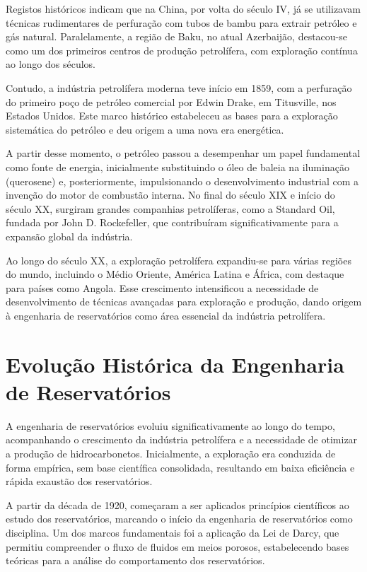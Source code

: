 \documentclass[12pt,a4paper]{report}
\begin{document}
Registos históricos indicam que na China, por volta do século IV, já se utilizavam técnicas rudimentares de perfuração com tubos de bambu para extrair petróleo e gás natural. Paralelamente, a região de Baku, no atual Azerbaijão, destacou-se como um dos primeiros centros de produção petrolífera, com exploração contínua ao longo dos séculos.

Contudo, a indústria petrolífera moderna teve início em 1859, com a perfuração do primeiro poço de petróleo comercial por Edwin Drake, em Titusville, nos Estados Unidos. Este marco histórico estabeleceu as bases para a exploração sistemática do petróleo e deu origem a uma nova era energética.

A partir desse momento, o petróleo passou a desempenhar um papel fundamental como fonte de energia, inicialmente substituindo o óleo de baleia na iluminação (querosene) e, posteriormente, impulsionando o desenvolvimento industrial com a invenção do motor de combustão interna. No final do século XIX e início do século XX, surgiram grandes companhias petrolíferas, como a Standard Oil, fundada por John D. Rockefeller, que contribuíram significativamente para a expansão global da indústria.

Ao longo do século XX, a exploração petrolífera expandiu-se para várias regiões do mundo, incluindo o Médio Oriente, América Latina e África, com destaque para países como Angola. Esse crescimento intensificou a necessidade de desenvolvimento de técnicas avançadas para exploração e produção, dando origem à engenharia de reservatórios como área essencial da indústria petrolífera.

\chapter{Evolução Histórica da Engenharia de Reservatórios}

A engenharia de reservatórios evoluiu significativamente ao longo do tempo, acompanhando o crescimento da indústria petrolífera e a necessidade de otimizar a produção de hidrocarbonetos. Inicialmente, a exploração era conduzida de forma empírica, sem base científica consolidada, resultando em baixa eficiência e rápida exaustão dos reservatórios.

A partir da década de 1920, começaram a ser aplicados princípios científicos ao estudo dos reservatórios, marcando o início da engenharia de reservatórios como disciplina. Um dos marcos fundamentais foi a aplicação da Lei de Darcy, que permitiu compreender o fluxo de fluidos em meios porosos, estabelecendo bases teóricas para a análise do comportamento dos reservatórios.
\end{document}

